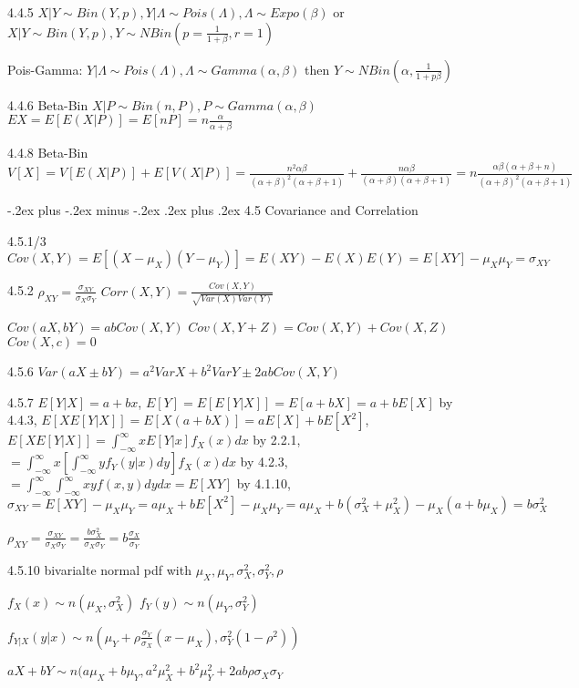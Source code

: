 \documentclass[10pt,landscape]{article}
\makeatletter
\renewcommand{\subsubsection}{\@startsection{subsubsection}{3}{0mm}%
                                {-.2ex plus -.2ex minus -.2ex}%
                                {.2ex plus .2ex}%
                                {\normalfont\small\bfseries}}
\makeatother
\begin{document}
\begin{multicols}{1}
4.4.5 $X|Y\sim Bin(Y,p), Y|\Lambda\sim Pois(\Lambda), \Lambda\sim Expo(\beta)$ or $X|Y\sim Bin(Y,p), Y\sim NBin(p=\frac1{1+\beta},r=1)$

Pois-Gamma: $Y|\Lambda\sim Pois(\Lambda), \Lambda\sim Gamma(\alpha,\beta)$ then $Y\sim NBin(\alpha,\frac1{1+p\beta})$

4.4.6 Beta-Bin $X|P\sim Bin(n,P), P\sim Gamma(\alpha,\beta)$ $EX=E[E(X|P)]=E[nP]=n\frac{\alpha}{\alpha+\beta}$

4.4.8 Beta-Bin $V[X]=V[E(X|P)]+E[V(X|P)]=\frac{n^2\alpha\beta}{(\alpha+\beta)^2(\alpha+\beta+1)}+\frac{n\alpha\beta}{(\alpha+\beta)(\alpha+\beta+1)}=n\frac{\alpha\beta(\alpha+\beta+n)}{(\alpha+\beta)^2(\alpha+\beta+1)}$

\subsubsection{4.5 Covariance and Correlation}

4.5.1/3 $Cov(X,Y)=E[(X-\mu_X)(Y-\mu_Y)]=E(XY)-E(X)E(Y)=E[XY]-\mu_X\mu_Y=\sigma_{XY}$

4.5.2 $\rho_{XY}=\frac{\sigma_{XY}}{\sigma_X\sigma_Y}$ $Corr(X,Y)=\frac{Cov(X,Y)}{\sqrt{Var(X)Var(Y)}}$

$Cov(aX,bY)=abCov(X,Y)$ $Cov(X,Y+Z)=Cov(X,Y)+Cov(X,Z)$ $Cov(X,c)=0$

4.5.6 $Var(aX\pm bY)=a^2VarX+b^2VarY\pm 2abCov(X,Y)$

4.5.7 $E[Y|X]=a+bx$, $E[Y]=E[E[Y|X]]=E[a+bX]=a+bE[X]$ by 4.4.3, $E[XE[Y|X]]=E[X(a+bX)]=aE[X]+bE[X^2]$, $E[XE[Y|X]]=\int_{-\infty}^{\infty}xE[Y|x]f_X(x)dx$ by 2.2.1, $=\int_{-\infty}^{\infty}x\left[\int_{-\infty}^{\infty}yf_Y(y|x)dy\right]f_X(x)dx$ by 4.2.3,$=\int_{-\infty}^{\infty}\int_{-\infty}^{\infty}xyf(x,y)dydx=E[XY]$ by 4.1.10, $\sigma_{XY}=E[XY]-\mu_X\mu_Y=a\mu_X+bE[X^2]-\mu_X\mu_Y=a\mu_X+b(\sigma_X^2+\mu_X^2)-\mu_X(a+b\mu_X)=b\sigma_X^2$

$\rho_{XY}=\frac{\sigma_{XY}}{\sigma_{X}\sigma_{Y}}=\frac{b\sigma_X^2}{\sigma_{X}\sigma_{Y}}=b\frac{\sigma_X}{\sigma_Y}$

4.5.10 bivarialte normal pdf with $\mu_X,\mu_Y,\sigma_X^2,\sigma_Y^2, \rho$

$f_X(x)\sim n(\mu_X,\sigma^2_X)$ $f_Y(y)\sim n(\mu_Y,\sigma^2_Y)$

$f_{Y|X}(y|x) \sim n\left(\mu_Y+\rho\frac{\sigma_Y}{\sigma_X}(x-\mu_X),\sigma_Y^2(1-\rho^2)\right)$

$aX+bY\sim n(a\mu_X+b\mu_Y,a^2\mu_X^2+b^2\mu_Y^2+2ab\rho\sigma_X\sigma_Y$


\end{multicols}
\end{document}
